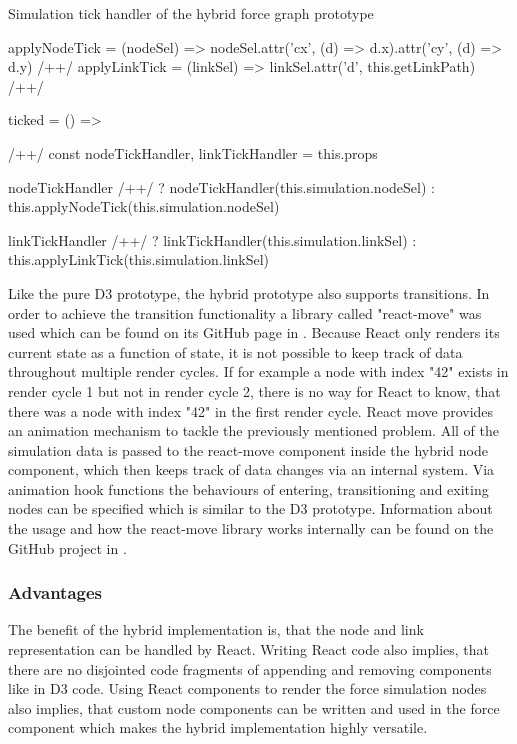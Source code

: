 \begin{program}
\caption{Simulation tick handler of the hybrid force graph prototype}
\label{prog:hybridTickHandler}
\begin{JsCode}
applyNodeTick = (nodeSel) => nodeSel.attr('cx', (d) => d.x).attr('cy', (d) => d.y) /+\label{line:applyNodeTick}+/
applyLinkTick = (linkSel) => linkSel.attr('d', this.getLinkPath) /+\label{line:applyLinkTick}+/

ticked = () => { /+\label{line:hybridTickHhandler}+/
  const { nodeTickHandler, linkTickHandler } = this.props

  nodeTickHandler /+\label{line:decideNodeTickHandler}+/
    ? nodeTickHandler(this.simulation.nodeSel)
    : this.applyNodeTick(this.simulation.nodeSel)

  linkTickHandler /+\label{line:decideLinkTickHandler}+/
    ? linkTickHandler(this.simulation.linkSel)
    : this.applyLinkTick(this.simulation.linkSel)
}
\end{JsCode}
\end{program}

Like the pure D3 prototype, the hybrid prototype also supports transitions. In order to achieve the transition functionality a library called "react-move" was used which can be found on its GitHub page in \cite{ReactMove}. Because React only renders its current state as a function of state, it is not possible to keep track of data throughout multiple render cycles. If for example a node with index "42" exists in render cycle 1 but not in render cycle 2, there is no way for React to know, that there was a node with index "42" in the first render cycle. React move provides an animation mechanism to tackle the previously mentioned problem. All of the simulation data is passed to the react-move component inside the hybrid node component, which then keeps track of data changes via an internal system. Via animation hook functions the behaviours of entering, transitioning and exiting nodes can be specified which is similar to the D3 prototype. Information about the usage and how the react-move library works internally can be found on the GitHub project in \cite{ReactMove}.

\subsubsection{Advantages}

The benefit of the hybrid implementation is, that the node and link representation can be handled by React. Writing React code also implies, that there are no disjointed code fragments of appending and removing components like in D3 code. Using React components to render the force simulation nodes also implies, that custom node components can be written and used in the force component which makes the hybrid implementation highly versatile.

